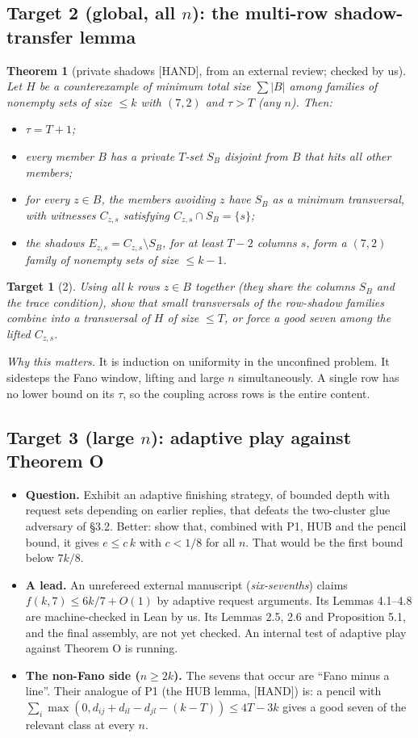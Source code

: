\documentclass[11pt]{article}
\newcommand{\st}[1]{\textsf{\small[#1]}}
\newtheorem*{thm}{Theorem}
\newtheorem*{tgt}{Target}
\begin{document}
\subsection*{Target 2 (global, all $n$): the multi-row shadow-transfer lemma}
\begin{thm}[private shadows \st{HAND}, from an external review; checked by us]
Let $H$ be a counterexample of minimum total size $\sum|B|$ among families of nonempty sets of size $\le k$ with $(7,2)$
and $\tau>T$ (any $n$). Then:
\begin{itemize}
\item $\tau=T+1$;
\item every member $B$ has a private $T$-set $S_B$ disjoint from $B$ that hits all other members;
\item for every $z\in B$, the members avoiding $z$ have $S_B$ as a minimum transversal, with witnesses $C_{z,s}$ satisfying
$C_{z,s}\cap S_B=\{s\}$;
\item the shadows $E_{z,s}=C_{z,s}\setminus S_B$, for at least $T-2$ columns $s$, form a $(7,2)$ family of nonempty sets of
size $\le k-1$.
\end{itemize}
\end{thm}
\begin{tgt}[2]
Using all $k$ rows $z\in B$ together (they share the columns $S_B$ and the trace condition), show that small transversals
of the row-shadow families combine into a transversal of $H$ of size $\le T$, or force a good seven among the lifted
$C_{z,s}$.
\end{tgt}
\noindent\emph{Why this matters.} It is induction on uniformity in the unconfined problem. It sidesteps the Fano window,
lifting and large $n$ simultaneously. A single row has no lower bound on its $\tau$, so the coupling across rows is the
entire content.

\subsection*{Target 3 (large $n$): adaptive play against Theorem O}
\begin{itemize}
\item \textbf{Question.} Exhibit an adaptive finishing strategy, of bounded depth with request sets depending on earlier
replies, that defeats the two-cluster glue adversary of \S3.2. Better: show that, combined with P1, HUB and the pencil
bound, it gives $e\le c\,k$ with $c<1/8$ for all $n$. That would be the first bound below $7k/8$.
\item \textbf{A lead.} An unrefereed external manuscript (\emph{six-sevenths}) claims $f(k,7)\le6k/7+O(1)$ by adaptive
request arguments. Its Lemmas 4.1--4.8 are machine-checked in Lean by us. Its Lemmas 2.5, 2.6 and Proposition 5.1, and the
final assembly, are not yet checked. An internal test of adaptive play against Theorem O is running.
\item \textbf{The non-Fano side ($n\ge2k$).} The sevens that occur are ``Fano minus a line''. Their analogue of P1 (the HUB
lemma, \st{HAND}) is: a pencil with
$\sum_i\max(0,d_{ij}+d_{il}-d_{jl}-(k-T))\le4T-3k$ gives a good seven of the relevant class at every $n$.
\end{itemize}
\end{document}
